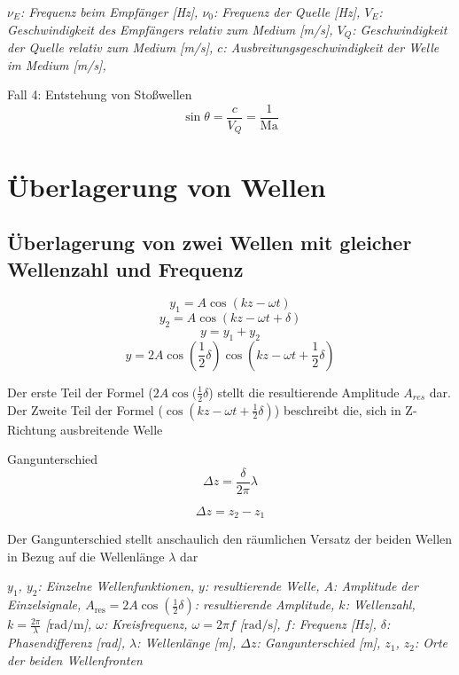 \documentclass[a5paper,10pt]{article}
\newenvironment{displayformula}
{
	\begin{framed}
		\color{formulaColor}
	}
	{\end{framed}}
\newcommand{\formulalegend}[1]{%
	\par\vspace{0.5ex}%
	{{\color{legendColor}\RaggedRight\small\textit{#1}}}%
	\par\vspace{1.5ex}%
}
\begin{document}
\formulalegend{
	$\nu_E$: Frequenz beim Empfänger [Hz], 
	$\nu_0$: Frequenz der Quelle [Hz], 
	$V_E$: Geschwindigkeit des Empfängers relativ zum Medium [m/s], 
	$V_Q$: Geschwindigkeit der Quelle relativ zum Medium [m/s], 
	$c$: Ausbreitungsgeschwindigkeit der Welle im Medium [m/s], 
}

\begin{displayformula}
	Fall 4: Entstehung von Stoßwellen
	\[
	\sin \theta = \frac{c}{V_Q} = \frac{1}{\text{Ma}}
	\]
\end{displayformula}

\section{Überlagerung von Wellen}

\subsection{Überlagerung von zwei Wellen mit gleicher Wellenzahl und Frequenz}
\begin{displayformula}
\[
y_1 = A \cos (kz - \omega t)
\]
\[
y_2 = A \cos (kz - \omega t + \delta)
\]
\[
y = y_1 + y_2
\]
\[
y = 2 A \cos (\frac{1}{2} \delta) \cos (kz - \omega t + \frac{1}{2} \delta)
\]
\end{displayformula}
Der erste Teil der Formel ($2A \cos (\frac{1}{2} \delta$) stellt die resultierende Amplitude $A_{res}$ dar. \\
Der Zweite Teil der Formel ($\cos (kz - \omega t + \frac{1}{2} \delta)$) beschreibt die, sich in Z-Richtung ausbreitende Welle

\begin{displayformula}
	Gangunterschied
	\[
	\Delta z = \frac{\delta}{2 \pi} \lambda
	\]
	
	\[
	\Delta z = z_2 - z_1
	\]
\end{displayformula}
Der Gangunterschied stellt anschaulich den räumlichen Versatz der beiden Wellen in Bezug auf die Wellenlänge $\lambda$ dar
\formulalegend{
	$y_1$, $y_2$: Einzelne Wellenfunktionen, 
	$y$: resultierende Welle, 
	$A$: Amplitude der Einzelsignale, 
	$A_{\text{res}} = 2A \cos(\frac{1}{2}\delta)$: resultierende Amplitude, 
	$k$: Wellenzahl, $k = \frac{2\pi}{\lambda}$ [$\text{rad}/\text{m}$], 
	$\omega$: Kreisfrequenz, $\omega = 2\pi f$ [$\text{rad}/\text{s}$], 
	$f$: Frequenz [Hz], 
	$\delta$: Phasendifferenz [rad], 
	$\lambda$: Wellenlänge [m], 
	$\Delta z$: Gangunterschied [m], 
	$z_1$, $z_2$: Orte der beiden Wellenfronten
}
\end{document}
